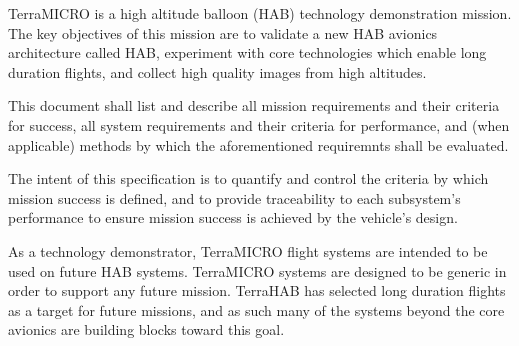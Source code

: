 TerraMICRO is a high altitude balloon (HAB) technology demonstration mission.
The key objectives of this mission are to validate a new HAB avionics 
architecture called \textmu HAB, experiment with core technologies which enable 
long duration flights, and collect high quality images from high altitudes.
    
This document shall list and describe all mission requirements and their 
criteria for success, all system requirements and their criteria for 
performance, and (when applicable) methods by which the aforementioned 
requiremnts shall be evaluated.

The intent of this specification is to quantify and control the criteria
by which mission success is defined, and to provide traceability to each
subsystem's performance to ensure mission success is achieved by the 
vehicle's design.

As a technology demonstrator, TerraMICRO flight systems are intended
to be used on future HAB systems. TerraMICRO systems are designed to be
generic in order to support any future mission. TerraHAB has selected long
duration flights as a target for future missions, and as such many of the 
systems beyond the core avionics are building blocks toward this goal.

